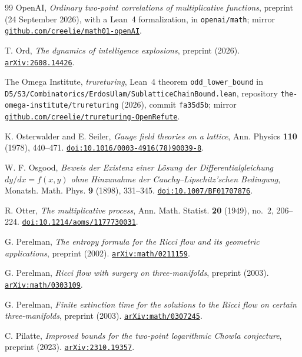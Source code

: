 \begin{thebibliography}{99}
OpenAI,
\emph{Ordinary two-point correlations of multiplicative functions},
preprint (24 September 2026), with a Lean~4 formalization, in \texttt{openai/math};
mirror \href{https://github.com/creelie/math01-openAI}{\nolinkurl{github.com/creelie/math01-openAI}}.

T. Ord,
\emph{The dynamics of intelligence explosions},
preprint (2026).
\href{https://arxiv.org/abs/2608.14426}{\nolinkurl{arXiv:2608.14426}}.

The Omega Institute,
\emph{trureturing}, Lean~4 theorem \texttt{odd\_lower\_bound} in \nolinkurl{D5/S3/Combinatorics/ErdosUlam/SublatticeChainBound.lean}, repository \nolinkurl{the-omega-institute/trureturing} (2026), commit \texttt{fa35d5b};
mirror \href{https://github.com/creelie/trureturing-OpenRefute}{\nolinkurl{github.com/creelie/trureturing-OpenRefute}}.

K. Osterwalder and E. Seiler,
\emph{Gauge field theories on a lattice},
Ann. Physics \textbf{110} (1978), 440--471.
\href{https://doi.org/10.1016/0003-4916(78)90039-8}{\nolinkurl{doi:10.1016/0003-4916(78)90039-8}}.

W. F. Osgood,
\emph{Beweis der Existenz einer L\"osung der Differentialgleichung $dy/dx=f(x,y)$ ohne Hinzunahme der Cauchy--Lipschitz'schen Bedingung},
Monatsh. Math. Phys. \textbf{9} (1898), 331--345.
\href{https://doi.org/10.1007/BF01707876}{\nolinkurl{doi:10.1007/BF01707876}}.

R. Otter,
\emph{The multiplicative process},
Ann. Math. Statist. \textbf{20} (1949), no.~2, 206--224.
\href{https://doi.org/10.1214/aoms/1177730031}{\nolinkurl{doi:10.1214/aoms/1177730031}}.

G. Perelman,
\emph{The entropy formula for the Ricci flow and its geometric applications},
preprint (2002).
\href{https://arxiv.org/abs/math/0211159}{\nolinkurl{arXiv:math/0211159}}.

G. Perelman,
\emph{Ricci flow with surgery on three-manifolds},
preprint (2003).
\href{https://arxiv.org/abs/math/0303109}{\nolinkurl{arXiv:math/0303109}}.

G. Perelman,
\emph{Finite extinction time for the solutions to the Ricci flow on certain three-manifolds},
preprint (2003).
\href{https://arxiv.org/abs/math/0307245}{\nolinkurl{arXiv:math/0307245}}.

C. Pilatte,
\emph{Improved bounds for the two-point logarithmic Chowla conjecture},
preprint (2023).
\href{https://arxiv.org/abs/2310.19357}{\nolinkurl{arXiv:2310.19357}}.


\end{thebibliography}
